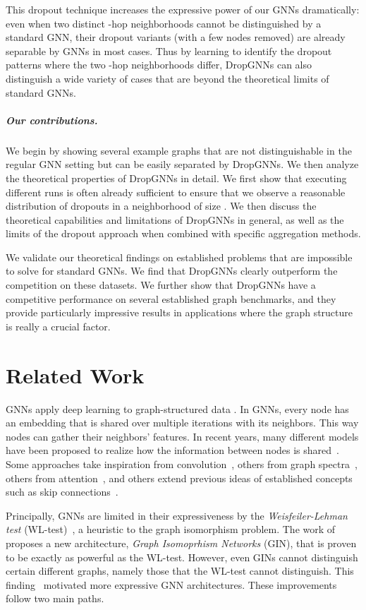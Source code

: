 \documentclass{article}
\begin{document}
This dropout technique increases the expressive power of our GNNs dramatically: even when two distinct -hop neighborhoods cannot be distinguished by a standard GNN, their dropout variants (with a few nodes removed) are already separable by GNNs in most cases. Thus by learning to identify the dropout patterns where the two -hop neighborhoods differ, DropGNNs can also distinguish a wide variety of cases that are beyond the theoretical limits of standard GNNs.

\subparagraph*{Our contributions.} We begin by showing several example graphs that are not distinguishable in the regular GNN setting but can be easily separated by DropGNNs. We then analyze the theoretical properties of DropGNNs in detail. We first show that executing  different runs is often already sufficient to ensure that we observe a reasonable distribution of dropouts in a neighborhood of size . We then discuss the theoretical capabilities and limitations of DropGNNs in general, as well as the limits of the dropout approach when combined with specific aggregation methods.

We validate our theoretical findings on established problems that are impossible to solve for standard GNNs. We find that DropGNNs clearly outperform the competition on these datasets. We further show that DropGNNs have a competitive performance on several established graph benchmarks, and they provide particularly impressive results in applications where the graph structure is really a crucial factor.

\section{Related Work}
GNNs apply deep learning to graph-structured data \citep{scarselli2008graph}. In GNNs, every node has an embedding that is shared over multiple iterations with its neighbors. This way nodes can gather their neighbors' features. In recent years, many different models have been proposed to realize how the information between nodes is shared~\citep{wu2020comprehensive}. Some approaches take inspiration from convolution~\citep{niepert2016learning, defferrard2016convolutional, hamilton2017inductive}, others from graph spectra~\citep{kipf2017semisupervised, bruna2014spectral}, others from attention~\citep{velickovic2018graph}, and others extend previous ideas of established concepts such as skip connections~\citep{xu2018jumping}.

Principally, GNNs are limited in their expressiveness by the \textit{Weisfeiler-Lehman test} (WL-test)~\citep{GIN}, a heuristic to the graph isomorphism problem. The work of \cite{GIN} proposes a new architecture, \textit{Graph Isomoprhism Networks} (GIN), that is proven to be exactly as powerful as the WL-test. However, even GINs cannot distinguish certain different graphs, namely those that the WL-test cannot distinguish. This finding~\citep{limits} motivated more expressive GNN architectures. These improvements follow two main paths.
\end{document}
